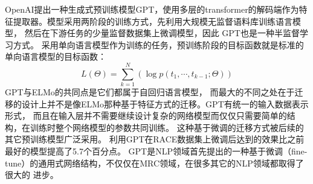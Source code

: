 OpenAI提出一种生成式预训练模型GPT，使用多层的transformer的解码端作为特征提取器。模型采用两阶段的训练方式，先利用大规模无监督语料库训练语言模型，
然后在下游任务的少量监督数据集上微调模型，因此
GPT也是一种半监督学习方式。
采用单向语言模型作为训练的任务，预训练阶段的目标函数就是标准的单向语言模型的目标函数：
\begin{equation}
    L(\Theta)=\sum_{k=1}^{N}(\log p(t_1,\cdots,t_{k-1};\Theta))
\end{equation}
GPT与ELMo的共同点是它们都属于自回归语言模型，
而最大的不同之处在于迁移的设计上并不是像ELMo那种基于特征方式的迁移。GPT有统一的输入数据表示形式，
而且在输入层并不需要继续设计复杂的网络模型而仅仅只需要简单的结构，在训练时整个网络模型的参数共同训练。
这种基于微调的迁移方式被后续的其它预训练模型广泛采用。
利用GPT在RACE数据集上微调后达到的效果比之前最好的模型提高了5.7个百分点。
GPT是NLP领域首先提出的一种基于微调（fine-tune）的通用式网络结构，不仅仅在MRC领域，在很多其它的NLP领域都取得了很大的
进步。
                
        


